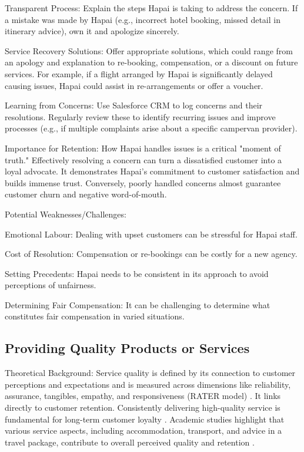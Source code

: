 \documentclass{article}
\begin{document}
Transparent Process: Explain the steps Hapai is taking to address the concern. If a mistake was made by Hapai (e.g., incorrect hotel booking, missed detail in itinerary advice), own it and apologize sincerely.

Service Recovery Solutions: Offer appropriate solutions, which could range from an apology and explanation to re-booking, compensation, or a discount on future services. For example, if a flight arranged by Hapai is significantly delayed causing issues, Hapai could assist in re-arrangements or offer a voucher.

Learning from Concerns: Use Salesforce CRM to log concerns and their resolutions. Regularly review these to identify recurring issues and improve processes (e.g., if multiple complaints arise about a specific campervan provider).

Importance for Retention:
How Hapai handles issues is a critical "moment of truth." Effectively resolving a concern can turn a dissatisfied customer into a loyal advocate. It demonstrates Hapai's commitment to customer satisfaction and builds immense trust. Conversely, poorly handled concerns almost guarantee customer churn and negative word-of-mouth.

Potential Weaknesses/Challenges:

Emotional Labour: Dealing with upset customers can be stressful for Hapai staff.

Cost of Resolution: Compensation or re-bookings can be costly for a new agency.

Setting Precedents: Hapai needs to be consistent in its approach to avoid perceptions of unfairness.

Determining Fair Compensation: It can be challenging to determine what constitutes fair compensation in varied situations.

\subsection{Providing Quality Products or Services}

Theoretical Background:
Service quality is defined by its connection to customer perceptions and expectations and is measured across dimensions like reliability, assurance, tangibles, empathy, and responsiveness (RATER model) \cite{barusman_customer_2020}. It links directly to customer retention. Consistently delivering high-quality service is fundamental for long-term customer loyalty \cite{petzer_customer_nodate}. Academic studies highlight that various service aspects, including accommodation, transport, and advice in a travel package, contribute to overall perceived quality and retention \cite{liljestam_predicting_nodate,viljoen_customer_2016}.
\end{document}
